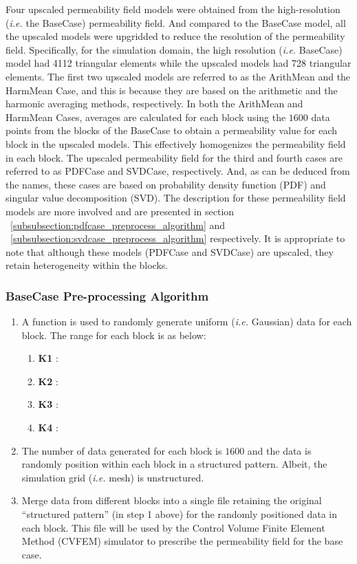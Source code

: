 \documentclass[preprint,12pt]{elsarticle}
\begin{document}
Four upscaled permeability field models were obtained from the high-resolution ({\it i.e.} the BaseCase) permeability field. And compared to the BaseCase model, all the upscaled models were upgridded to reduce the resolution of the permeability field. Specifically, for the simulation domain, the high resolution ({\it i.e.} BaseCase) model had 4112 triangular elements while the upscaled models had 728 triangular elements. The first two upscaled models are referred to as the ArithMean and the HarmMean Case, and this is because they are based on the arithmetic and the harmonic averaging methods, respectively. In both the ArithMean and HarmMean Cases, averages are calculated for each block using the $1600$ data points from the blocks of the BaseCase to obtain a permeability value for each block in the upscaled models. This effectively homogenizes the permeability field in each block. The upscaled permeability field for the third and fourth cases are referred to as PDFCase and SVDCase, respectively. And, as can be deduced from the names, these cases are based on probability density function (PDF) and singular value decomposition (SVD). The description for these permeability field models are more involved and are presented in section ~\ref{subsubsection:pdfcase_preprocess_algorithm} and ~\ref{subsubsection:svdcase_preprocess_algorithm} respectively. It is appropriate to note that although these models (PDFCase and SVDCase) are upscaled, they retain heterogeneity within the blocks.

\subsubsection{BaseCase Pre-processing Algorithm}\label{subsubsection:basecase_preprocess_algorithm}
\begin{enumerate}[1]
  \item A function is used to randomly generate uniform ({\it i.e.} Gaussian) data for each block. The range for each block is as below:
  \begin{enumerate}[a]
    \item \textbf{K1} :
    \item \textbf{K2} :
    \item \textbf{K3} :
    \item \textbf{K4} : 
  \end{enumerate}                                                    
  \item The number of data generated for each block is $1600$ and the data is randomly position within each block in a structured pattern. Albeit, the simulation grid ({\it i.e.} mesh) is unstructured.
  \item Merge data from different blocks into a single file retaining the original ``structured pattern'' (in step 1 above) for the randomly positioned data in each block. This file will be used by the Control Volume Finite Element Method (CVFEM) simulator to prescribe the permeability field for the base case.
\end{enumerate}
\end{document}

